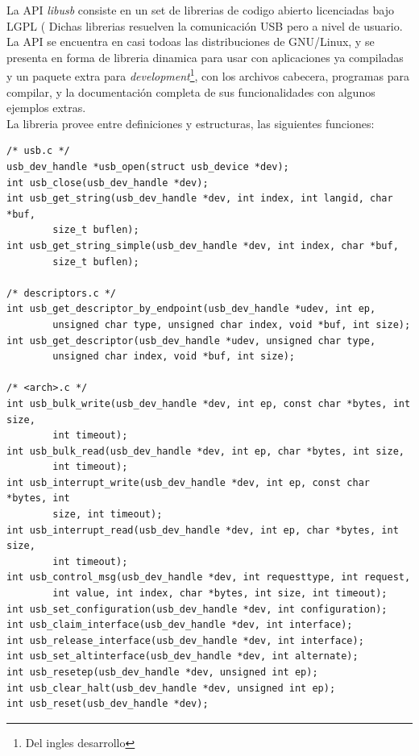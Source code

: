 La API \emph{libusb} consiste en un set de librerias de codigo abierto
licenciadas bajo LGPL (%
Dichas librerias resuelven la comunicaci\'on
USB pero a nivel de usuario.
La API se encuentra en casi todoas las distribuciones de GNU/Linux, y se
presenta en forma de libreria dinamica para usar con aplicaciones ya
compiladas y un paquete extra para \emph{development}\footnote{Del ingles
desarrollo}, con los archivos cabecera, programas para compilar, y
la documentaci\'on completa de sus funcionalidades con algunos ejemplos
extras. \\

La libreria provee entre definiciones y estructuras, las siguientes funciones:
\begin{footnotesize}
\begin{verbatim}
/* usb.c */
usb_dev_handle *usb_open(struct usb_device *dev);
int usb_close(usb_dev_handle *dev);
int usb_get_string(usb_dev_handle *dev, int index, int langid, char *buf,
        size_t buflen);
int usb_get_string_simple(usb_dev_handle *dev, int index, char *buf,
        size_t buflen);

/* descriptors.c */
int usb_get_descriptor_by_endpoint(usb_dev_handle *udev, int ep,
        unsigned char type, unsigned char index, void *buf, int size);
int usb_get_descriptor(usb_dev_handle *udev, unsigned char type,
        unsigned char index, void *buf, int size);

/* <arch>.c */
int usb_bulk_write(usb_dev_handle *dev, int ep, const char *bytes, int size,
        int timeout);
int usb_bulk_read(usb_dev_handle *dev, int ep, char *bytes, int size,
        int timeout);
int usb_interrupt_write(usb_dev_handle *dev, int ep, const char *bytes, int
		size, int timeout);
int usb_interrupt_read(usb_dev_handle *dev, int ep, char *bytes, int size,
        int timeout);
int usb_control_msg(usb_dev_handle *dev, int requesttype, int request,
        int value, int index, char *bytes, int size, int timeout);
int usb_set_configuration(usb_dev_handle *dev, int configuration);
int usb_claim_interface(usb_dev_handle *dev, int interface);
int usb_release_interface(usb_dev_handle *dev, int interface);
int usb_set_altinterface(usb_dev_handle *dev, int alternate);
int usb_resetep(usb_dev_handle *dev, unsigned int ep);
int usb_clear_halt(usb_dev_handle *dev, unsigned int ep);
int usb_reset(usb_dev_handle *dev);
\end{verbatim}
\end{footnotesize}


